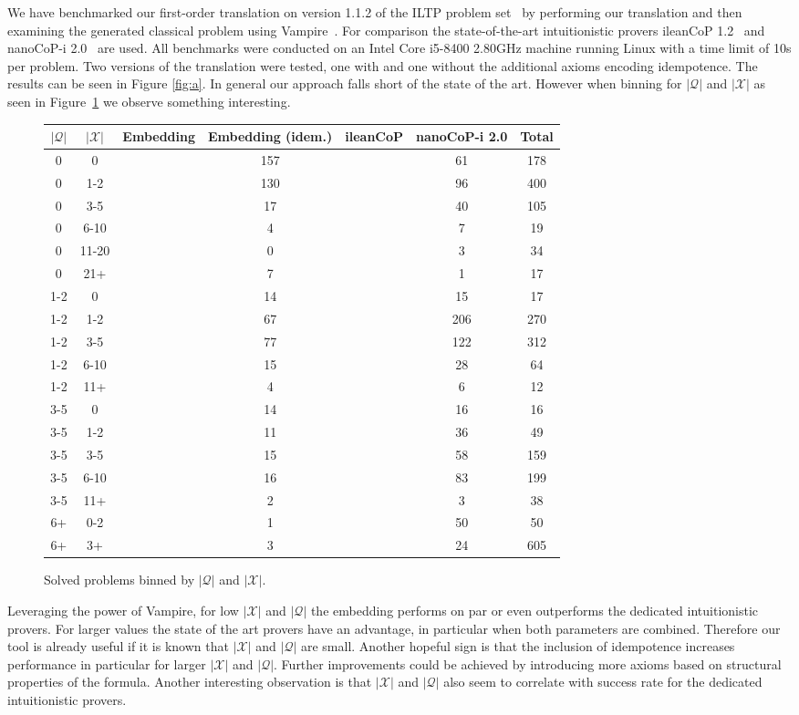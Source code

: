 \documentclass[runningheads]{llncs}
\begin{document}
We have benchmarked our first-order translation on version 1.1.2 of the ILTP problem set~\cite{iltp} by performing our translation and then examining the generated classical problem using Vampire~\cite{kovacs2013first}. For comparison the state-of-the-art intuitionistic provers ileanCoP 1.2~\cite{otten2008leancop} and nanoCoP-i 2.0~\cite{otten2021nanocop} are used. All benchmarks were conducted on an Intel Core i5-8400 2.80GHz machine running Linux with a time limit of 10s per problem. Two versions of the translation were tested, one with and one without the additional axioms encoding idempotence. The results can be seen in Figure \ref{fig:a}. In general our approach falls short of the state of the art. However when binning for $|\mathcal Q|$ and $|\mathcal X|$ as seen in Figure~\ref{fig:b} we observe something interesting.
\begin{figure}
	\centering
	\begin{tabular}{c|c|c|c|c|c|c}
		$|\mathcal Q|$&$|\mathcal X|$&Embedding&Embedding (idem.)&ileanCoP&nanoCoP-i 2.0&Total\\\hline
		0&0&&157&&61&178\\
		0&1-2&&130&&96&400\\
		0&3-5&&17&&40&105\\
		0&6-10&&4&&7&19\\
		0&11-20&&0&&3&34\\
		0&21+&&7&&1&17\\
		1-2&0&&14&&15&17\\
		1-2&1-2&&67&&206&270\\
		1-2&3-5&&77&&122&312\\
		1-2&6-10&&15&&28&64\\
		1-2&11+&&4&&6&12\\
		3-5&0&&14&&16&16\\
		3-5&1-2&&11&&36&49\\
		3-5&3-5&&15&&58&159\\
		3-5&6-10&&16&&83&199\\
		3-5&11+&&2&&3&38\\
		6+&0-2&&1&&50&50\\
		6+&3+&&3&&24&605
	\end{tabular}
	\caption{Solved problems binned by $|\mathcal Q|$ and $|\mathcal X|$.}
	\label{fig:b}
\end{figure}
Leveraging the power of Vampire, for low $|\mathcal X|$ and $|\mathcal Q|$ the embedding performs on par or even outperforms the dedicated intuitionistic provers. For larger values the state of the art provers have an advantage, in particular when both parameters are combined. Therefore our tool is already useful if it is known that $|\mathcal X|$ and $|\mathcal Q|$ are small. Another hopeful sign is that the inclusion of idempotence increases performance in particular for larger $|\mathcal X|$ and $|\mathcal Q|$. Further improvements could be achieved by introducing more axioms based on structural properties of the formula.
Another interesting observation is that $|\mathcal X|$ and $|\mathcal Q|$ also seem to correlate with success rate for the dedicated intuitionistic provers.
\end{document}
